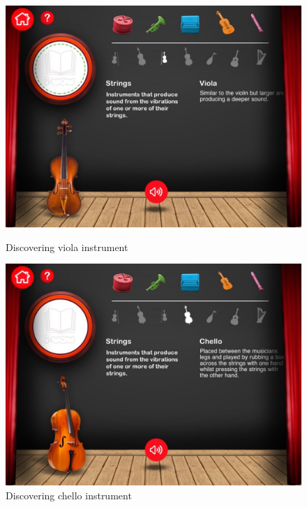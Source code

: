 \begin{figure}[ht!]
  \centering
  \includegraphics[width=350pt]{graphics/additional-screens/discovering_strings_viola_screen.jpg}
  \vspace{0.05cm}
  \caption{Discovering viola instrument}
  \vspace{0.6cm}

  \includegraphics[width=350pt]{graphics/additional-screens/discovering_strings_chello_screen.jpg}
  \vspace{0.05cm}
  \caption{Discovering chello instrument}
\end{figure}

